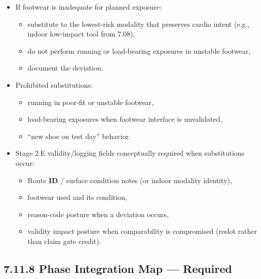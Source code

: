 \documentclass[10pt]{article}
\begin{document}
\begin{itemize}
\item If footwear is inadequate for planned exposure:
  \begin{itemize}
  \item substitute to the lowest-risk modality that preserves cardio intent (e.g., indoor low-impact tool from 7.08),
  \item do not perform running or load-bearing exposures in unstable footwear,
  \item document the deviation.
  \end{itemize}
\item Prohibited substitutions:
  \begin{itemize}
  \item running in poor-fit or unstable footwear,
  \item load-bearing exposures when footwear interface is unvalidated,
  \item “new shoe on test day” behavior.
  \end{itemize}
\item Stage 2.E validity/logging fields conceptually required when substitutions occur:
  \begin{itemize}
  \item Route \textbf{ID} / surface condition notes (or indoor modality identity),
  \item footwear used and its condition,
  \item reason-code posture when a deviation occurs,
  \item validity impact posture when comparability is compromised (reslot rather than claim gate credit).
  \end{itemize}
\end{itemize}

\subsection*{7.11.8 Phase Integration Map — Required}
{}

\begingroup
\scriptsize
\setlength{\tabcolsep}{2pt}
\renewcommand{\arraystretch}{1.12}
\end{document}
